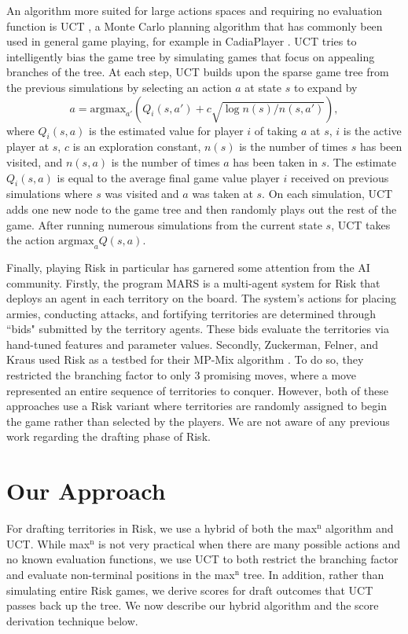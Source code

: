 \documentclass[letterpaper]{article}
\numberwithin{equation}{section}
\numberwithin{theorem}{section}
\numberwithin{lemma}{section}
\numberwithin{df}{section}
\begin{document}
An algorithm more suited for large actions spaces and requiring no evaluation function is UCT \cite{UCT}, a Monte Carlo planning algorithm that has commonly been used in general game playing, for example in CadiaPlayer \cite{Cadia}.  UCT tries to intelligently bias the game tree by simulating games that focus on appealing branches of the tree.  At each step, UCT builds upon the sparse game tree from the previous simulations by selecting an action $a$ at state $s$ to expand by
\[ a = \text{argmax}_{a'} \left( Q_i(s,a') + c \sqrt{ \log n(s) / n(s,a') } \right), \]
where $Q_i(s,a)$ is the estimated value for player $i$ of taking $a$ at $s$, $i$ is the active player at $s$, $c$ is an exploration constant, $n(s)$ is the number of times $s$ has been visited, and $n(s,a)$ is the number of times $a$ has been taken in $s$.  The estimate $Q_i(s,a)$ is equal to the average final game value player $i$ received on previous simulations where $s$ was visited and $a$ was taken at $s$.  On each simulation, UCT adds one new node to the game tree and then randomly plays out the rest of the game.  After running numerous simulations from the current state $s$, UCT takes the action $\text{argmax}_{a}Q(s,a)$.

Finally, playing Risk in particular has garnered some attention from the AI community.  Firstly, the program MARS \cite{RiskBots} is a multi-agent system for Risk that deploys an agent in each territory on the board.  The system's actions for placing armies, conducting attacks, and fortifying territories are determined through ``bids" submitted by the territory agents.  These bids evaluate the territories via hand-tuned features and parameter values.  Secondly, Zuckerman, Felner, and Kraus used Risk as a testbed for their MP-Mix algorithm \cite{ZuckFelnerKraus2009}.  To do so, they restricted the branching factor to only 3 promising moves, where a move represented an entire sequence of territories to conquer.  However, both of these approaches use a Risk variant where territories are randomly assigned to begin the game rather than selected by the players.  We are not aware of any previous work regarding the drafting phase of Risk.

\section{Our Approach}

For drafting territories in Risk, we use a hybrid of both the max$^\text{n}$ algorithm and UCT.  While max$^\text{n}$ is not very practical when there are many possible actions and no known evaluation functions, we use UCT to both restrict the branching factor and evaluate non-terminal positions in the max$^\text{n}$ tree.  In addition, rather than simulating entire Risk games, we derive scores for draft outcomes that UCT passes back up the tree.  We now describe our hybrid algorithm and the score derivation technique below.
\end{document}
